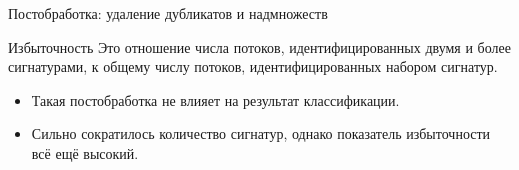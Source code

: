 \documentclass[10pt]{beamer}
\begin{document}
\begin{frame}{Постобработка: удаление дубликатов и надмножеств}

    \begin{block}{Избыточность}
        Это отношение числа потоков, идентифицированных двумя и более сигнатурами, к общему числу потоков, идентифицированных набором сигнатур.
    \end{block}

    \begin{table}[]
    \end{table}

    \begin{itemize}
        \item Такая постобработка не влияет на результат классификации.
        \item Сильно сократилось количество сигнатур, однако показатель избыточности всё ещё высокий.
    \end{itemize}
\end{frame}
\end{document}
